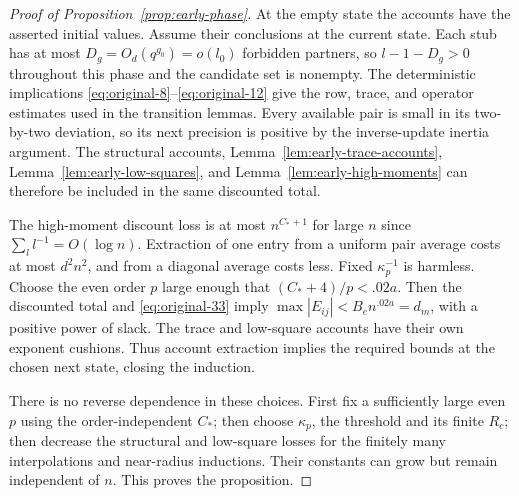 \begin{proof}[Proof of Proposition~\ref{prop:early-phase}]
At the empty state the accounts have the asserted initial values.
Assume their conclusions at the current state. Each stub has at
most \(D_g=O_d(q^{g_0})=o(l_0)\) forbidden partners, so
\(l-1-D_g>0\) throughout this phase and the candidate set is
nonempty. The deterministic
implications \eqref{eq:original-8}--\eqref{eq:original-12} give the
row, trace, and operator estimates used in the transition lemmas.
Every available pair is small in its two-by-two deviation, so its
next precision is positive by the inverse-update inertia argument.
The structural accounts, Lemma~\ref{lem:early-trace-accounts},
Lemma~\ref{lem:early-low-squares}, and
Lemma~\ref{lem:early-high-moments} can therefore be included in the
same discounted total.

The high-moment discount loss is at most \(n^{C_*+1}\) for large
\(n\) since \(\sum_l l^{-1}=O(\log n)\). Extraction of one entry
from a uniform pair average costs at most \(d^2n^2\), and from a
diagonal average costs less. Fixed \(\kappa_p^{-1}\) is harmless.
Choose the even order \(p\) large enough that
\((C_*+4)/p<.02a\). Then the discounted total and
\eqref{eq:original-33} imply
\(\max|E_{ij}|<B_en^{.02a}=d_m\), with a positive power of slack.
The trace and low-square accounts have their own exponent cushions.
Thus account extraction implies the required bounds at the chosen
next state, closing the induction.

There is no reverse dependence in these choices. First fix a
sufficiently large even \(p\) using the order-independent \(C_*\);
then choose \(\kappa_p\), the threshold and its finite \(R_c\);
then decrease the structural and low-square losses for the finitely
many interpolations and near-radius inductions. Their constants can
grow but remain independent of \(n\). This proves the proposition.
\end{proof}
